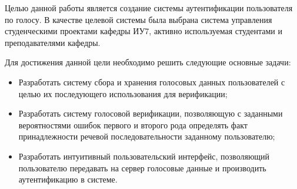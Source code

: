 \Intro


Целью данной работы является создание системы аутентификации пользователя по голосу. В качестве целевой системы была выбрана система управления студенческими проектами кафедры ИУ7, активно используемая студентами и преподавателями кафедры.

Для достижения данной цели необходимо решить следующие основные задачи:

\begin{itemize}
\item Разработать систему сбора и хранения голосовых данных пользователей с целью их последующего использования для верификации;
\item Разработать систему голосовой верификации, позволяющую с заданными вероятностями ошибок первого и второго рода определять факт принадлежности речевой последовательности заданному пользователю;
\item Разработать интуитивный пользовательский интерфейс, позволяющий пользователю передавать на сервер голосовые данные и производить аутентификацию в системе.
\end{itemize}
